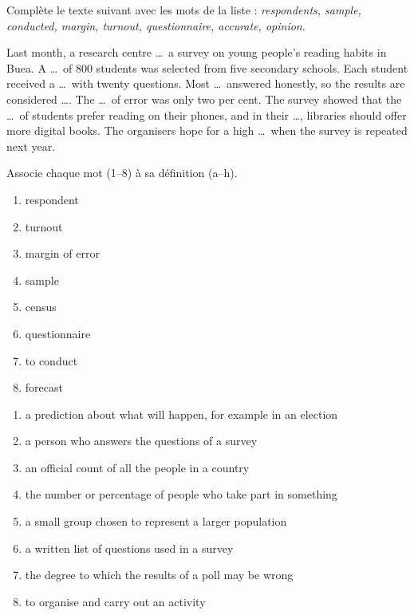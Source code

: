 \documentclass[11pt]{article}
\begin{document}
\begin{exercice}
Complète le texte suivant avec les mots de la liste : \emph{respondents, sample, conducted, margin, turnout, questionnaire, accurate, opinion}.

\begin{textebox}
Last month, a research centre \ldots\ a survey on young people's reading habits in Buea. A \ldots\ of 800 students was selected from five secondary schools. Each student received a \ldots\ with twenty questions. Most \ldots\ answered honestly, so the results are considered \ldots. The \ldots\ of error was only two per cent. The survey showed that the \ldots\ of students prefer reading on their phones, and in their \ldots, libraries should offer more digital books. The organisers hope for a high \ldots\ when the survey is repeated next year.
\end{textebox}
\end{exercice}

\begin{exercice}
Associe chaque mot (1--8) à sa définition (a--h).
\begin{enumerate}
\item respondent
\item turnout
\item margin of error
\item sample
\item census
\item questionnaire
\item to conduct
\item forecast
\end{enumerate}
\begin{enumerate}[label=\alph*)]
\item a prediction about what will happen, for example in an election
\item a person who answers the questions of a survey
\item an official count of all the people in a country
\item the number or percentage of people who take part in something
\item a small group chosen to represent a larger population
\item a written list of questions used in a survey
\item the degree to which the results of a poll may be wrong
\item to organise and carry out an activity
\end{enumerate}
\end{exercice}
\end{document}
